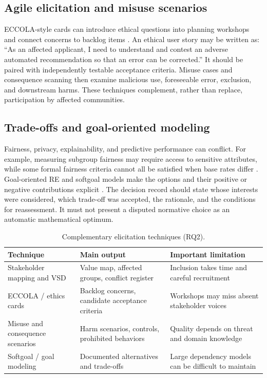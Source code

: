 \documentclass[11pt,a4paper]{article}
\begin{document}
\subsection{Agile elicitation and misuse scenarios}
ECCOLA-style cards can introduce ethical questions into planning workshops and connect concerns to backlog items \cite{vakkuri2021}. An ethical user story may be written as: ``As an affected applicant, I need to understand and contest an adverse automated recommendation so that an error can be corrected.'' It should be paired with independently testable acceptance criteria. Misuse cases and consequence scanning then examine malicious use, foreseeable error, exclusion, and downstream harms. These techniques complement, rather than replace, participation by affected communities.

\subsection{Trade-offs and goal-oriented modeling}
Fairness, privacy, explainability, and predictive performance can conflict. For example, measuring subgroup fairness may require access to sensitive attributes, while some formal fairness criteria cannot all be satisfied when base rates differ \cite{kleinberg2017}. Goal-oriented RE and softgoal models make the options and their positive or negative contributions explicit \cite{chung2000,yu1997}. The decision record should state whose interests were considered, which trade-off was accepted, the rationale, and the conditions for reassessment. It must not present a disputed normative choice as an automatic mathematical optimum.

\begin{table}[htbp]
\centering\small
\caption{Complementary elicitation techniques (RQ2).}\label{tab:elicitation}
\begin{tabularx}{\linewidth}{p{2.8cm}X X}
\toprule
\textbf{Technique} & \textbf{Main output} & \textbf{Important limitation}\\\midrule
Stakeholder mapping and VSD & Value map, affected groups, conflict register & Inclusion takes time and careful recruitment\\
ECCOLA / ethics cards & Backlog concerns, candidate acceptance criteria & Workshops may miss absent stakeholder voices\\
Misuse and consequence scenarios & Harm scenarios, controls, prohibited behaviors & Quality depends on threat and domain knowledge\\
Softgoal / goal modeling & Documented alternatives and trade-offs & Large dependency models can be difficult to maintain\\
\bottomrule
\end{tabularx}
\end{table}
\end{document}
